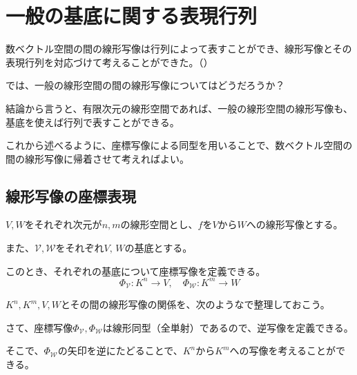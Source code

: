 \documentclass[../../../topic_linear-algebra]{subfiles}
\begin{document}
\sectionline
\section{一般の基底に関する表現行列}

数ベクトル空間の間の線形写像は行列によって表すことができ、線形写像とその表現行列を対応づけて考えることができた。（）

では、一般の線形空間の間の線形写像についてはどうだろうか？

\br

結論から言うと、有限次元の線形空間であれば、一般の線形空間の線形写像も、基底を使えば行列で表すことができる。

これから述べるように、座標写像による同型を用いることで、数ベクトル空間の間の線形写像に帰着させて考えればよい。

\subsection{線形写像の座標表現}

$V,W$をそれぞれ次元が$n,m$の線形空間とし、$f$を$V$から$W$への線形写像とする。

また、$\mathcal{V}, \mathcal{W}$をそれぞれ$V,\,W$の基底とする。

\br

このとき、それぞれの基底について座標写像を定義できる。
\begin{equation*}
  \Phi_{\mathcal{V}}\colon K^n \to V, \quad
  \Phi_{\mathcal{W}}\colon K^m \to W
\end{equation*}

$K^n, K^m, V, W$とその間の線形写像の関係を、次のようなで整理しておこう。
\begin{center}
\end{center}

\br

さて、座標写像$\Phi_{\mathcal{V}}, \Phi_{\mathcal{W}}$は線形同型（全単射）であるので、逆写像を定義できる。

そこで、$\Phi_{\mathcal{W}}$の矢印を逆にたどることで、$K^n$から$K^m$への写像を考えることができる。
\begin{center}
\end{center}
\end{document}
